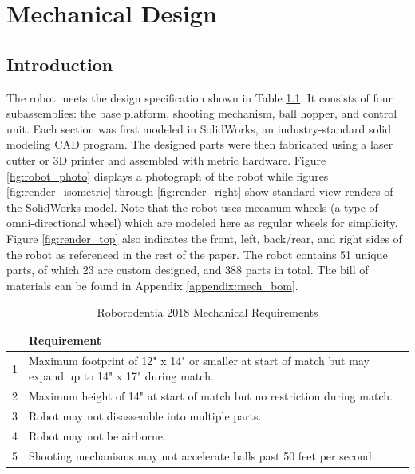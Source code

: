 \chapter{Mechanical Design}
\section{Introduction}
The robot meets the design specification shown in Table \ref{tab:roborodentia_reqs}. It consists of four subassemblies: the base platform, shooting mechanism, ball hopper, and control unit. Each section was first modeled in SolidWorks, an industry-standard solid modeling CAD program. The designed parts were then fabricated using a laser cutter or 3D printer and assembled with metric hardware. Figure \ref{fig:robot_photo} displays a photograph of the robot while figures \ref{fig:render_isometric} through \ref{fig:render_right} show standard view renders of the SolidWorks model. Note that the robot uses mecanum wheels (a type of omni-directional wheel) which are modeled here as regular wheels for simplicity. Figure \ref{fig:render_top} also indicates the front, left, back/rear, and right sides of the robot as referenced in the rest of the paper.  The robot contains 51 unique parts, of which 23 are custom designed, and 388 parts in total. The bill of materials can be found in Appendix \ref{appendix:mech_bom}.

\begin{table}[h]
	\centering	\caption{Roborodentia 2018 Mechanical Requirements}
	\begin{tabular}{cp{5in}}
		\hline 
		& Requirement \\ 
		\hline 
		1 & \ssp Maximum footprint of 12" x 14" or smaller at start of match but may expand up to 14" x 17" during match. \\ 
		\hline 
		2 & \ssp Maximum height of 14" at start of match but no restriction during match. \\ 
		\hline 
		3 & Robot may not disassemble into multiple parts. \\ 
		\hline 
		4 & Robot may not be airborne. \\ 
		\hline 
		5 & Shooting mechanisms may not accelerate balls past 50 feet per second. \\ 
		\hline 
	\end{tabular} 
	\label{tab:roborodentia_reqs}
\end{table}

